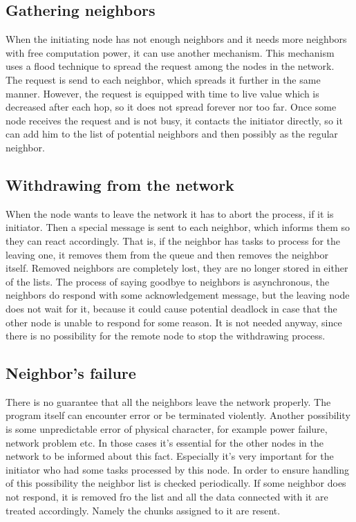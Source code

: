 \subsection*{Gathering neighbors}

When the initiating node has not enough neighbors and it needs more
neighbors with free computation power, it can use another mechanism.
This mechanism uses a flood technique to spread the request among the
nodes in the network. The request is send to each neighbor, which
spreads it further in the same manner. However, the request is equipped
with time to live value which is decreased after each hop, so it does
not spread forever nor too far. Once some node receives the request and
is not busy, it contacts the initiator directly, so it can add him to
the list of potential neighbors and then possibly as the regular
neighbor.

\subsection*{Withdrawing from the network}

When the node wants to leave the network it has to abort the process, if
it is initiator. Then a special message is sent to each neighbor, which
informs them so they can react accordingly. That is, if the neighbor has
tasks to process for the leaving one, it removes them from the queue and
then removes the neighbor itself. Removed neighbors are completely lost,
they are no longer stored in either of the lists. The process of saying
goodbye to neighbors is asynchronous, the neighbors do respond with some
acknowledgement message, but the leaving node does not wait for it,
because it could cause potential deadlock in case that the other node is
unable to respond for some reason. It is not needed anyway, since there
is no possibility for the remote node to stop the withdrawing process.

\subsection*{Neighbor's failure}

There is no guarantee that all the neighbors leave the network properly.
The program itself can encounter error or be terminated violently.
Another possibility is some unpredictable error of physical character,
for example power failure, network problem etc. In those cases it's
essential for the other nodes in the network to be informed about this
fact. Especially it's very important for the initiator who had some
tasks processed by this node. In order to ensure handling of this
possibility the neighbor list is checked periodically. If some neighbor
does not respond, it is removed fro the list and all the data connected
with it are treated accordingly. Namely the chunks assigned to it are
resent.

